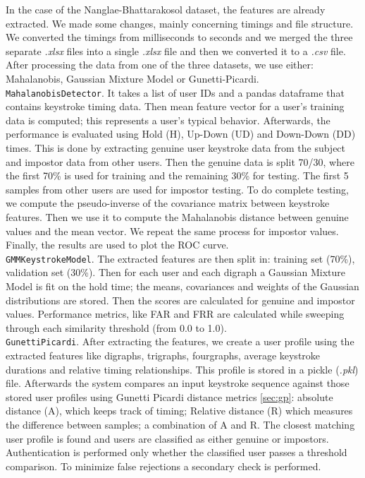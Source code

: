 In the case of the Nanglae-Bhattarakosol dataset, the features are already extracted. We made some changes, mainly concerning timings and file structure. We converted the timings from milliseconds to seconds and we merged the three separate \textit{.xlsx} files into a single \textit{.xlsx} file and then we converted it to a \textit{.csv} file.\\

After processing the data from one of the three datasets, we use either: Mahalanobis, Gaussian Mixture Model or Gunetti-Picardi.\\

\lstinline|MahalanobisDetector|. It takes a list of user IDs and a pandas dataframe that contains keystroke timing data. Then mean feature vector for a user's training data is computed; this represents a user's typical behavior. Afterwards, the performance is evaluated using Hold (H), Up-Down (UD) and Down-Down (DD) times. This is done by extracting genuine user keystroke data from the subject and impostor data from other users. Then the genuine data is split 70/30, where the first 70\% is used for training and the remaining 30\% for testing. The first 5 samples from other users are used for impostor testing. To do complete testing, we compute the pseudo-inverse of the covariance matrix between keystroke features. Then we use it to compute the Mahalanobis distance between genuine values and the mean vector. We repeat the same process for impostor values. Finally, the results are used to plot the ROC curve.\\

\lstinline|GMMKeystrokeModel|. The extracted features are then split in: training set (70\%), validation set (30\%). Then for each user and each digraph a Gaussian Mixture Model is fit on the hold time; the means, covariances and weights of the Gaussian distributions are stored. Then the scores are calculated for genuine and impostor values. Performance metrics, like FAR and FRR are calculated while sweeping through each similarity threshold (from 0.0 to 1.0).\\

\lstinline|GunettiPicardi|. After extracting the features, we create a user profile using the extracted features like digraphs, trigraphs, fourgraphs, average keystroke durations and relative timing relationships. This profile is stored in a pickle (\textit{.pkl}) file. Afterwards the system compares an input keystroke sequence against those stored user profiles using Gunetti Picardi distance metrics \ref{sec:gp}: absolute distance (A), which keeps track of timing; Relative distance (R) which measures the difference between samples; a combination of A and R. The closest matching user profile is found and users are classified as either genuine or impostors. Authentication is performed only whether the classified user passes a threshold comparison. To minimize false rejections a secondary check is performed.